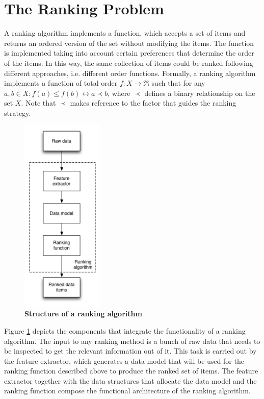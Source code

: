 \section{The Ranking Problem}\label{sec:ranking}
A ranking algorithm implements a function, which accepts a set of items and returns an ordered version of the set without modifying the items. The function is implemented taking into account certain preferences that determine the order of the items. In this way, the same collection of items could be ranked following different approaches, i.e. different order functions. 
Formally, a ranking algorithm implements a function of total order $f: X \rightarrow \Re$ such that for any $a, b \in X: f(a) \leq f(b) \leftrightarrow a \prec b$, where $\prec$ defines a binary relationship on the set $X$. Note that $\prec$ makes reference to the factor that guides the ranking strategy.

\begin{figure}[htbp!]
\begin{center}
\includegraphics[width=0.35\textwidth]{figs/algo-arch.pdf}
\caption{{\bf Structure of a ranking algorithm}}
\label{fig:fig1}
\end{center}
\end{figure}

Figure \ref{fig:fig1} depicts the components that integrate the functionality of a ranking algorithm. The input to any ranking method is a bunch of raw data that needs to be inspected to get the relevant information out of it. This task is carried out by the feature extractor, which generates a data model that will be used for the ranking function described above to produce the ranked set of items. The feature extractor together with the data structures that allocate the data model and the ranking function compose the functional architecture of the ranking algorithm.



